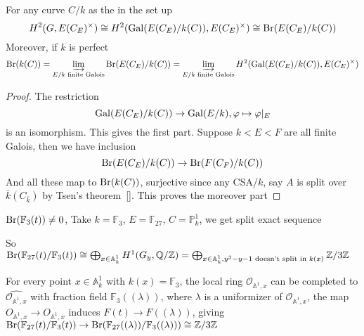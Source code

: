 \documentclass[a4paper,10pt]{article}
\begin{document}
\begin{lemma}
For any curve $C/k$ as the in the set up
\[
H^2(G,E(C_E)^\times)\cong H^2(\operatorname{Gal}(E(C_E)/k(C)),E(C_E)^\times)\cong\operatorname{Br}(E(C_E)/k(C))
\]
Moreover, if $k$ is perfect
\[
\operatorname{Br}(k(C))=\varinjlim_{E/k\text{ finite Galois}}\operatorname{Br}(E(C_E)/k(C))=\varinjlim_{E/k\text{ finite Galois}}H^2(\operatorname{Gal}(E(C_E)/k(C)),E(C_E)^\times)
\]
\end{lemma}

\begin{proof}
The restriction
\[
\operatorname{Gal}(E(C_E)/k(C))\to\operatorname{Gal}(E/k), \varphi\mapsto\varphi|_E
\]
is an isomorphism. This gives the first part. Suppose $k<E<F$ are all finite Galois, then we have inclusion
\[
\operatorname{Br}(E(C_E)/k(C))\to\operatorname{Br}(F(C_F)/k(C))
\]
And all these map to $\operatorname{Br}(k(C))$, surjective since any CSA/$k$, say $A$ is split over $\bar k(C_{\bar k})$ by Tsen's theorem~\ref{}. This proves the moreover part
\end{proof}

\begin{example}
$\operatorname{Br}(\mathbb F_3(t))\neq0$, Take $k=\mathbb F_3$, $E=\mathbb F_{27}$, $C=\mathbb P^1_k$, we get split exact sequence
\begin{center}
\end{center}
So $\operatorname{Br}(\mathbb F_{27}(t)/\mathbb F_3(t))\cong\bigoplus_{x\in\mathbb A^1_k}H^1(G_y,\mathbb Q/\mathbb Z)=\bigoplus_{x\in\mathbb A^1_k,y^3-y-1\text{ doesn't split in }k(x)}\mathbb Z/3\mathbb Z$

For every point $x\in \mathbb A^1_k$ with $k(x)=\mathbb F_3$, the local ring $\mathcal O_{\mathbb A^1,x}$ can be completed to $\widehat{\mathcal O_{\mathbb A^1,x}}$ with fraction field $\mathbb F_3((\lambda))$, where $\lambda$ is a uniformizer of $\mathcal O_{\mathbb A^1,x}$, the map $O_{\mathbb A^1,x}\to\widehat{O_{\mathbb A^1,x}}$ induces $F(t)\to F((\lambda))$, giving $\operatorname{Br}(\mathbb F_{27}(t)/\mathbb F_3(t))\to\operatorname{Br}(\mathbb F_{27}((\lambda))/\mathbb F_3((\lambda)))\cong \mathbb Z/3\mathbb Z$
\end{example}
\end{document}
